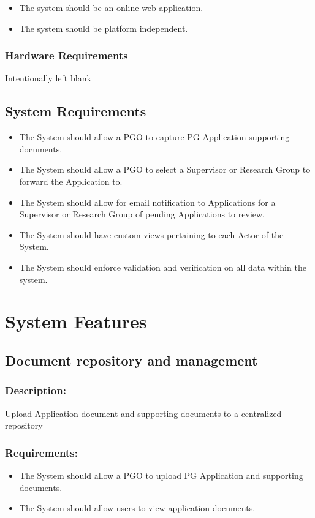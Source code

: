 \documentclass[]{article}
\begin{document}
\begin{itemize}
	\item	The system should be an online web application.
	\item 	The system should be platform independent.
\end{itemize}
\subsubsection{Hardware Requirements}
Intentionally left blank

\subsection{System Requirements}
\begin{itemize}
\item	The System should allow a PGO to capture PG Application supporting documents.
\item   The System should allow a PGO to select a Supervisor or Research Group to forward the Application to. 
\item   The System should allow for email notification to Applications for a Supervisor or Research Group of pending Applications to review.
\item   The System should have custom views pertaining to each Actor of the System.
\item	The System should enforce validation and verification on all data within the system.
\end{itemize}

\section{System Features}

\subsection{Document repository and management}
\subsubsection{ Description: }Upload Application document and supporting documents to a centralized repository
\subsubsection{ Requirements:}
\begin{itemize}
\item  The System should allow a PGO to upload PG Application and supporting documents.
\item The System should allow users to view application documents.
\end{itemize}
\end{document}
